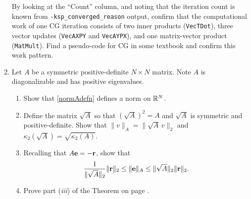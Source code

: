 \begin{enumerate}
By looking at the ``Count'' column, and noting that the iteration count is known from \texttt{-ksp\_converged\_reason} output, confirm that the computational work of one CG iteration consists of two inner products (\texttt{VecTDot}), three vector updates (\texttt{VecAXPY} and \texttt{VecAYPX}), and one matrix-vector product (\texttt{MatMult}).  Find a pseudo-code for CG in some textbook and confirm this work pattern.
\item Let $A$ be a symmetric positive-definite $N\times N$ matrix.  Note $A$ is diagonalizable and has positive eigenvalues.
  \renewcommand{\labelenumii}{(\emph{\roman{enumii}})}
  \begin{enumerate}
  \item Show that \eqref{normAdefn} defines a norm on $\RR^N$.
  \item Define the matrix $$ so that $()^2 = A$ and $$ is symmetric and positive-definite.  Show that $\|v\|_A = \|\,v\|_2$ and $\kappa_2\left(\right) = $.
  \item Recalling that $A\be=-\br$, show that
      $$\frac{1}{\|\sqrt{A}\|_2} \|\br\|_2 \le \|\be\|_A \le \|\sqrt{A}\|_2 \|\br\|_2.$$
  \item Prove part (\emph{iii}) of the Theorem on page \pageref{thm:cgiterations}.
  \end{enumerate}
\end{enumerate}
